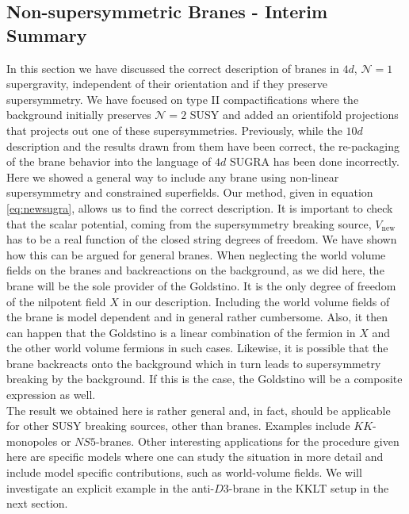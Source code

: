 \documentclass[a4paper,12pt,twoside,openright]{report}
\begin{document}
\subsection{Non-supersymmetric Branes - Interim Summary}
In this section we have discussed the correct description of branes in $4d$, $\mathcal{N}=1$ supergravity, independent of their orientation and if they preserve supersymmetry. We have focused on type II compactifications where the background initially preserves $\mathcal{N}=2$ SUSY and added an orientifold projections that projects out one of these supersymmetries. Previously, while the $10d$ description and the results drawn from them have been correct, the re-packaging of  the brane behavior into the language of $4d$ SUGRA has been done incorrectly. Here we showed a general way to include any brane using non-linear supersymmetry and constrained superfields. Our method, given in equation \eqref{eq:newsugra}, allows us to find the correct description. It is important to check that the scalar potential, coming from the supersymmetry breaking source, $V_{\text{new}}$ has to be a real function of the closed string degrees of freedom. We have shown how this can be argued for general branes. When neglecting the world volume fields on the branes and backreactions on the background, as we did here, the brane will be the sole provider of the Goldstino. It is the only degree of freedom of the nilpotent field $X$ in our description. Including the world volume fields of the brane is model dependent and in general rather cumbersome. Also, it then can happen that the Goldstino is a linear combination of the fermion in $X$ and the other world volume fermions in such cases. Likewise, it is possible that the brane backreacts onto the background which in turn leads to supersymmetry breaking by the background. If this is the case, the Goldstino will be a composite expression as well.\\
The result we obtained here is rather general and, in fact, should be applicable for other SUSY breaking sources, other than branes. Examples include $KK$-monopoles or $NS5$-branes. Other interesting applications for the procedure given here are specific models where one can study the situation in more detail and include model specific contributions, such as world-volume fields. We will investigate an explicit example in the anti-$D3$-brane in the KKLT setup in the next section.
\end{document}
